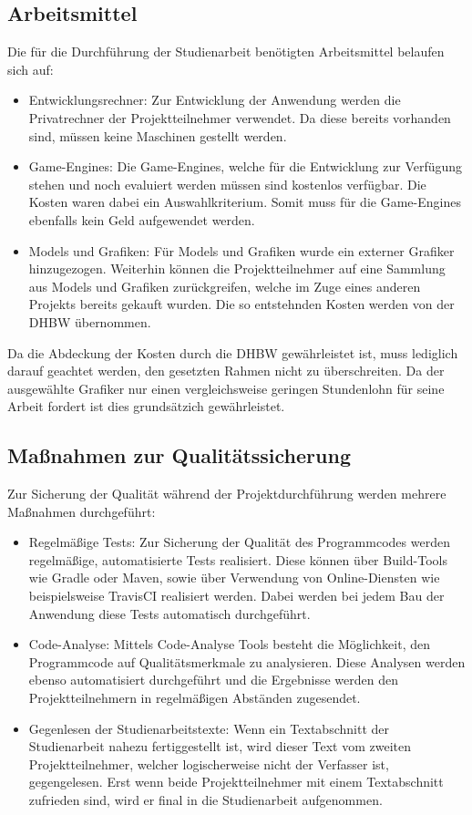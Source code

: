 \subsection{Arbeitsmittel}
Die für die Durchführung der Studienarbeit benötigten Arbeitsmittel belaufen sich auf:
\begin{itemize}
	\item{Entwicklungsrechner: Zur Entwicklung der Anwendung werden die Privatrechner der Projektteilnehmer verwendet. Da diese bereits vorhanden sind, müssen keine Maschinen gestellt werden.}
	\item{Game-Engines: Die Game-Engines, welche für die Entwicklung zur Verfügung stehen und noch evaluiert werden müssen sind kostenlos verfügbar. Die Kosten waren dabei ein Auswahlkriterium. Somit muss für die Game-Engines ebenfalls kein Geld aufgewendet werden.}
	\item{Models und Grafiken: Für Models und Grafiken wurde ein externer Grafiker hinzugezogen. Weiterhin können die Projektteilnehmer auf eine Sammlung aus Models und Grafiken zurückgreifen, welche im Zuge eines anderen Projekts bereits gekauft wurden. Die so entstehnden Kosten werden von der DHBW übernommen.}
\end{itemize}
Da die Abdeckung der Kosten durch die DHBW gewährleistet ist, muss lediglich darauf geachtet werden, den gesetzten Rahmen nicht zu überschreiten. Da der ausgewählte Grafiker nur einen vergleichsweise geringen Stundenlohn für seine Arbeit fordert ist dies grundsätzich gewährleistet.

\subsection{Maßnahmen zur Qualitätssicherung}
Zur Sicherung der Qualität während der Projektdurchführung werden mehrere Maßnahmen durchgeführt:
\begin{itemize}
	\item{Regelmäßige Tests: Zur Sicherung der Qualität des Programmcodes werden regelmäßige, automatisierte Tests realisiert. Diese können über Build-Tools wie Gradle oder Maven, sowie über Verwendung von Online-Diensten wie beispielsweise TravisCI realisiert werden. Dabei werden bei jedem Bau der Anwendung diese Tests automatisch durchgeführt.}
	\item{Code-Analyse: Mittels Code-Analyse Tools besteht die Möglichkeit, den Programmcode auf Qualitätsmerkmale zu analysieren. Diese Analysen werden ebenso automatisiert durchgeführt und die Ergebnisse werden den Projektteilnehmern in regelmäßigen Abständen zugesendet.}
	\item{Gegenlesen der Studienarbeitstexte: Wenn ein Textabschnitt der Studienarbeit nahezu fertiggestellt ist, wird dieser Text vom zweiten Projektteilnehmer, welcher logischerweise nicht der Verfasser ist, gegengelesen. Erst wenn beide Projektteilnehmer mit einem Textabschnitt zufrieden sind, wird er final in die Studienarbeit aufgenommen.}
\end{itemize}

